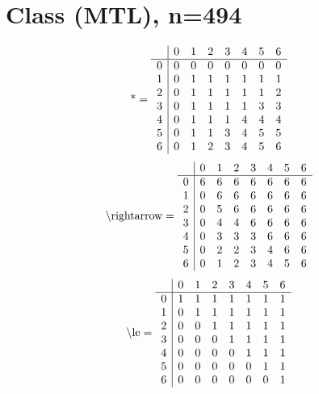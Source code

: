 \documentclass[11pt]{article}
\begin{document}
\section{Class (MTL), n=494}
\[\text{*} = 
\begin{array}{r | r r r r r r r}
 & 0 & 1 & 2 & 3 & 4 & 5 & 6 \\ \hline
0 & 0 & 0 & 0 & 0 & 0 & 0 & 0 \\
1 & 0 & 1 & 1 & 1 & 1 & 1 & 1 \\
2 & 0 & 1 & 1 & 1 & 1 & 1 & 2 \\
3 & 0 & 1 & 1 & 1 & 1 & 3 & 3 \\
4 & 0 & 1 & 1 & 1 & 4 & 4 & 4 \\
5 & 0 & 1 & 1 & 3 & 4 & 5 & 5 \\
6 & 0 & 1 & 2 & 3 & 4 & 5 & 6 \\
\end{array}
\]
\[\text{\textbackslash rightarrow} = 
\begin{array}{r | r r r r r r r}
 & 0 & 1 & 2 & 3 & 4 & 5 & 6 \\ \hline
0 & 6 & 6 & 6 & 6 & 6 & 6 & 6 \\
1 & 0 & 6 & 6 & 6 & 6 & 6 & 6 \\
2 & 0 & 5 & 6 & 6 & 6 & 6 & 6 \\
3 & 0 & 4 & 4 & 6 & 6 & 6 & 6 \\
4 & 0 & 3 & 3 & 3 & 6 & 6 & 6 \\
5 & 0 & 2 & 2 & 3 & 4 & 6 & 6 \\
6 & 0 & 1 & 2 & 3 & 4 & 5 & 6 \\
\end{array}
\]
\[\text{\textbackslash le} = 
\begin{array}{r | r r r r r r r}
 & 0 & 1 & 2 & 3 & 4 & 5 & 6 \\ \hline
0 & 1 & 1 & 1 & 1 & 1 & 1 & 1 \\
1 & 0 & 1 & 1 & 1 & 1 & 1 & 1 \\
2 & 0 & 0 & 1 & 1 & 1 & 1 & 1 \\
3 & 0 & 0 & 0 & 1 & 1 & 1 & 1 \\
4 & 0 & 0 & 0 & 0 & 1 & 1 & 1 \\
5 & 0 & 0 & 0 & 0 & 0 & 1 & 1 \\
6 & 0 & 0 & 0 & 0 & 0 & 0 & 1 \\
\end{array}
\]
\end{document}
